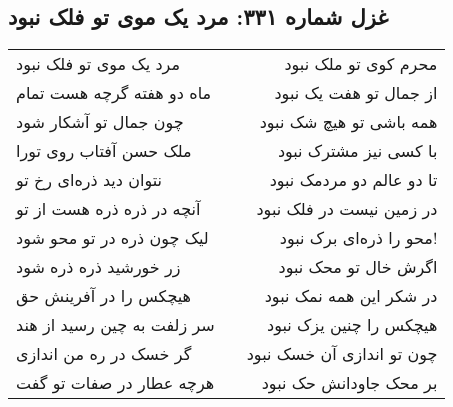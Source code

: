 \begin{center}
\section*{غزل شماره ۳۳۱: مرد یک موی تو فلک نبود}
\label{sec:331}
\begin{longtable}{l p{0.5cm} r}
مرد یک موی تو فلک نبود
&&
محرم کوی تو ملک نبود
\\
ماه دو هفته گرچه هست تمام
&&
از جمال تو هفت یک نبود
\\
چون جمال تو آشکار شود
&&
همه باشی تو هیچ شک نبود
\\
ملک حسن آفتاب روی تورا
&&
با کسی نیز مشترک نبود
\\
نتوان دید ذره‌ای رخ تو
&&
تا دو عالم دو مردمک نبود
\\
آنچه در ذره ذره هست از تو
&&
در زمین نیست در فلک نبود
\\
لیک چون ذره در تو محو شود
&&
محو را ذره‌ای برک نبود!
\\
زر خورشید ذره ذره شود
&&
اگرش خال تو محک نبود
\\
هیچکس را در آفرینش حق
&&
در شکر این همه نمک نبود
\\
سر زلفت به چین رسید از هند
&&
هیچکس را چنین یزک نبود
\\
گر خسک در ره من اندازی
&&
چون تو اندازی آن خسک نبود
\\
هرچه عطار در صفات تو گفت
&&
بر محک جاودانش حک نبود
\\
\end{longtable}
\end{center}
